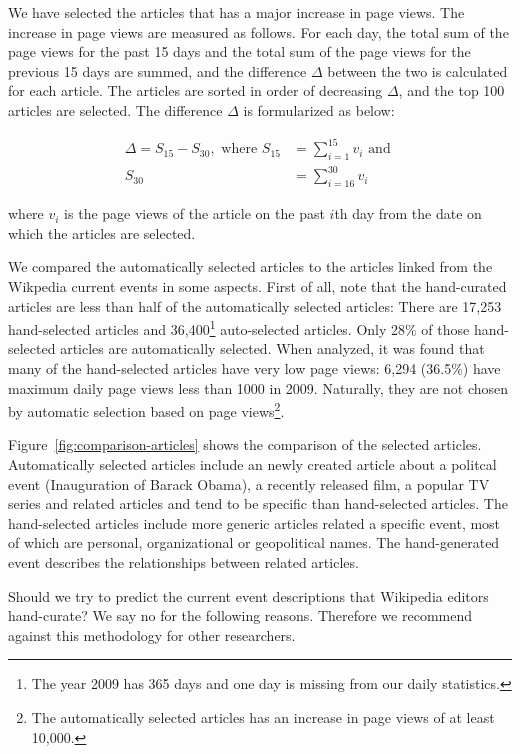 \documentclass[11pt]{article}
\newcommand{\war}[1]{{\sf\small #1}}
\begin{document}
We have selected the articles that has a major increase in page views. The increase in page views are measured as follows. For each day, the total sum of the page views for the past 15 days and the total sum of the page views for the previous 15 days are summed, and the difference $\Delta$ between the two is calculated for each article. The articles are sorted in order of decreasing $\Delta$, and the top 100 articles are selected. The difference $\Delta$ is formularized as below:

\begin{align*}
\Delta = S_{15} - S_{30}, \mbox{ where } S_{15} & = \sum_{i=1}^{15} v_i \mbox{ and }\\
S_{30} & = \sum_{i=16}^{30} v_i
\end{align*}

where $v_i$ is the page views of the article on the past $i$th day from the date on which the articles are selected.

We compared the automatically selected articles to the articles linked from the Wikpedia current events in some aspects. First of all, note that the hand-curated articles are less than half of the automatically selected articles: There are 17,253 hand-selected articles and 36,400\footnote{The year 2009 has 365 days and one day is missing from our daily statistics.} auto-selected articles. Only 28\% of those hand-selected articles are automatically selected. When analyzed, it was found that many of the hand-selected articles have very low page views: 6,294 (36.5\%) have maximum daily page views less than 1000 in 2009. Naturally, they are not chosen by automatic selection based on page views\footnote{The automatically selected articles has an increase in page views of at least 10,000.}.

Figure~\ref{fig:comparison-articles} shows the comparison of the selected articles. Automatically selected articles include an newly created article about a politcal event (\war{Inauguration of Barack Obama}), a recently released film, a popular TV series and related articles and tend to be specific than hand-selected articles. The hand-selected articles include more generic articles related a specific event, most of which are personal, organizational or geopolitical names. The hand-generated event describes the relationships between related articles.

Should we try to predict the current event descriptions that Wikipedia editors hand-curate? We say no for the following reasons. Therefore we recommend against this methodology for other researchers.
\end{document}
